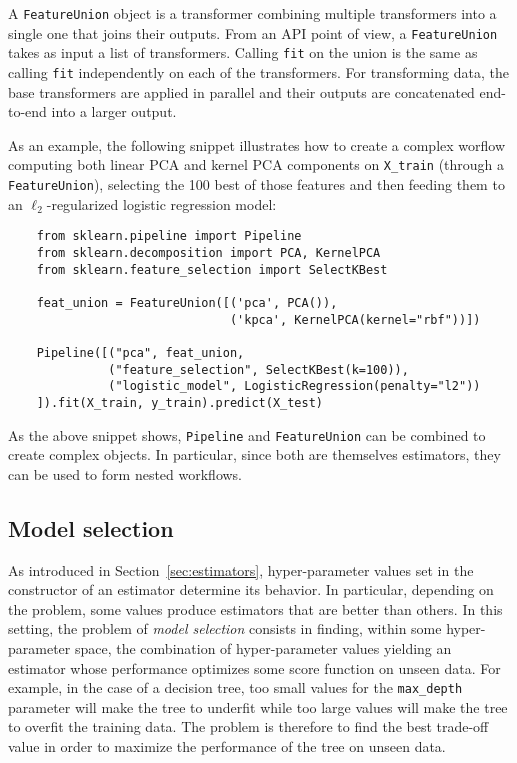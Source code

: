 \documentclass{llncs}
\begin{document}
A \texttt{FeatureUnion} object is a transformer combining multiple transformers
into a single one that joins their outputs. From an API point of view, a
\texttt{FeatureUnion} takes as input a list of transformers. Calling
\texttt{fit} on the union is the same as calling \texttt{fit} independently on
each of the transformers. For transforming data, the base transformers are
applied in parallel and their outputs are concatenated end-to-end into a larger
output.

As an example, the following snippet illustrates how to create a complex worflow
computing both linear PCA and kernel PCA components on \texttt{X\_train}
(through a \texttt{FeatureUnion}), selecting the 100 best of those features and
then feeding them to an $\ell_2$-regularized logistic regression model:
\begin{verbatim}
    from sklearn.pipeline import Pipeline
    from sklearn.decomposition import PCA, KernelPCA
    from sklearn.feature_selection import SelectKBest

    feat_union = FeatureUnion([('pca', PCA()),
                               ('kpca', KernelPCA(kernel="rbf"))])

    Pipeline([("pca", feat_union,
              ("feature_selection", SelectKBest(k=100)),
              ("logistic_model", LogisticRegression(penalty="l2"))
    ]).fit(X_train, y_train).predict(X_test)
\end{verbatim}

As the above snippet shows, \texttt{Pipeline} and \texttt{FeatureUnion} can be
combined to create complex objects. In particular, since both are themselves
estimators, they can be used to form nested workflows.

\subsection{Model selection}

As introduced in Section~\ref{sec:estimators}, hyper-parameter values set in the
constructor of an estimator determine its behavior. In particular, depending on
the problem, some values produce estimators that are better than others. In this
setting, the problem of \textit{model selection} consists in finding, within
some hyper-parameter space, the combination of hyper-parameter values yielding
an estimator whose performance optimizes some score function on unseen data. For
example, in the case of a decision tree, too small values for the
\texttt{max\_depth} parameter will make the tree to underfit while too large
values will make the tree to overfit the training data. The problem is therefore
to find the best trade-off value in order to maximize the performance of the
tree on unseen data.
\end{document}

